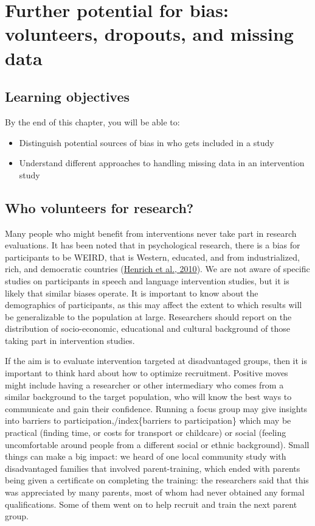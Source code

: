 \documentclass{krantz}
\begin{document}
\hypertarget{dropouts}{%
\chapter{Further potential for bias: volunteers, dropouts, and missing data}\label{dropouts}}

\hypertarget{learning-objectives-8}{%
\section{Learning objectives}\label{learning-objectives-8}}

By the end of this chapter, you will be able to:

\begin{itemize}
\item
  Distinguish potential sources of bias in who gets included in a study
\item
  Understand different approaches to handling missing data in an intervention study
\end{itemize}

\hypertarget{who-volunteers-for-research}{%
\section{Who volunteers for research?}\label{who-volunteers-for-research}}

Many people who might benefit from interventions never take part in research evaluations. It has been noted that in psychological research, there is a bias for participants to be WEIRD, that is Western, educated, and from industrialized, rich, and democratic countries (\protect\hyperlink{ref-henrich2010}{Henrich et al., 2010}). We are not aware of specific studies on participants in speech and language intervention studies, but it is likely that similar biases operate. It is important to know about the demographics of participants, as this may affect the extent to which results will be generalizable to the population at large. Researchers should report on the distribution of socio-economic, educational and cultural background of those taking part in intervention studies.

If the aim is to evaluate intervention targeted at disadvantaged groups, then it is important to think hard about how to optimize recruitment. Positive moves might include having a researcher or other intermediary who comes from a similar background to the target population, who will know the best ways to communicate and gain their confidence. Running a focus group may give insights into barriers to participation,/index\{barriers to participation\} which may be practical (finding time, or costs for transport or childcare) or social (feeling uncomfortable around people from a different social or ethnic background). Small things can make a big impact: we heard of one local community study with disadvantaged families that involved parent-training, which ended with parents being given a certificate on completing the training: the researchers said that this was appreciated by many parents, most of whom had never obtained any formal qualifications. Some of them went on to help recruit and train the next parent group.
\end{document}
